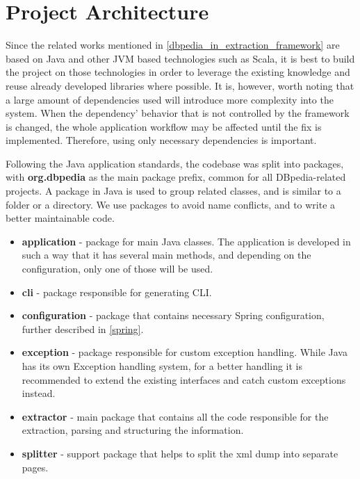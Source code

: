 \documentclass[thesis=M,english,hidelinks]{FITthesis}[2019/12/23]
\begin{document}
\section{Project Architecture}

Since the related works mentioned in \ref{dbpedia_in_extraction_framework} are based on Java and other \gls{JVM} based technologies such as Scala, it is best to build the project on those technologies in order to leverage the existing knowledge and reuse already developed libraries where possible. It is, however, worth noting that a large amount of dependencies used will introduce more complexity into the system. When the dependency' behavior that is not controlled by the framework is changed, the whole application workflow may be affected until the fix is implemented. Therefore, using only necessary dependencies is important.



Following the Java application standards, the codebase was split into packages, with \textbf{org.dbpedia} as the main package prefix, common for all DBpedia-related projects. A package in Java is used to group related classes, and is similar to a folder or a directory. We use packages to avoid name conflicts, and to write a better maintainable code.

\begin{itemize}
	\item \textbf{application} - package for main Java classes. The application is developed in such a way that it has several main methods, and depending on the configuration, only one of those will be used.
	\item \textbf{cli} - package responsible for generating \gls{CLI}.
	\item \textbf{configuration} - package that contains necessary Spring configuration, further described in \ref{spring}.
	\item \textbf{exception} - package responsible for custom exception handling. While Java has its own Exception handling system, for a better handling it is recommended to extend the existing interfaces and catch custom exceptions instead.
	\item \textbf{extractor} - main package that contains all the code responsible for the extraction, parsing and structuring the information.
	\item \textbf{splitter} - support package that helps to split the xml dump into separate pages.
\end{itemize}
\end{document}
